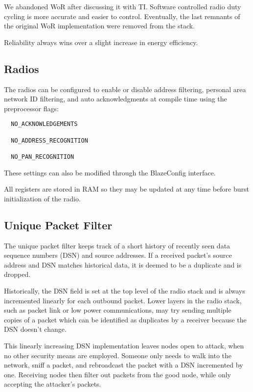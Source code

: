 \documentclass{article}
\begin{document}
We abandoned WoR after discussing it with TI. Software controlled radio duty cycling is 
more accurate and easier to control. Eventually, the last remnants of the original WoR 
implementation were removed from the stack. 

Reliability always wins over a slight increase in energy efficiency.

\subsection{Radios}
\label{sec:radios}
The radios can be configured to enable or disable address filtering, personal area network
ID filtering, and auto acknowledgments at compile time using the preprocessor flags:

\begin{verbatim}
  NO_ACKNOWLEDGEMENTS
  
  NO_ADDRESS_RECOGNITION
  
  NO_PAN_RECOGNITION
\end{verbatim}

These settings can also be modified through the BlazeConfig interface.

All registers are stored in RAM so they may be updated at any time before burst initialization
of the radio. 

\subsection{Unique Packet Filter}
\label{sec:unique}
The unique packet filter keeps track of a short history of recently seen data sequence numbers (DSN) and source
addresses. If a received packet's source address and DSN matches historical data, it is deemed to be a duplicate
and is dropped.  

Historically, the DSN field is set at the top level of the radio stack and is always incremented
linearly for each outbound packet.  Lower layers in the radio stack, such as packet link or low power communications,
may try sending multiple copies of a packet which can be identified as duplicates by a receiver because the 
DSN doesn't change.

This linearly increasing DSN implementation leaves nodes open to attack, when no other security means
are employed. Someone only needs to walk into the network, sniff a packet, and rebroadcast the packet
with a DSN incremented by one. Receiving nodes then filter out packets from the good node, while
only accepting the attacker's packets.
\end{document}
